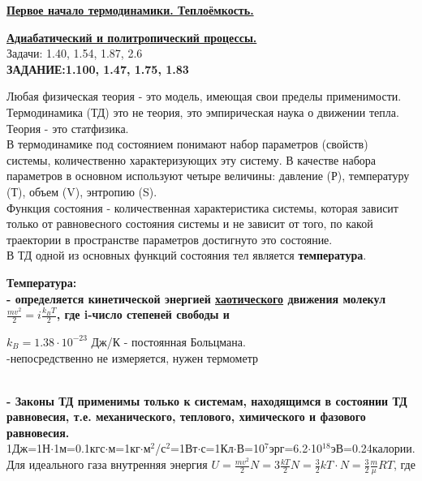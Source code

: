 \documentclass[12pt]{article}
\begin{document}
{\underline{\bf Первое начало термодинамики. Теплоёмкость.}

{\underline{\bf Адиабатический и политропический процессы.}\\

Задачи: 1.40, 1.54, 1.87, 2.6}\\

{\bf ЗАДАНИЕ:1.100, 1.47, 1.75, 1.83}

\vspace{0.5cm}

Любая физическая теория - это модель, имеющая свои пределы применимости. Термодинамика (ТД) это не
теория, это эмпирическая наука о движении тепла. Теория - это статфизика.\\

В термодинамике под состоянием понимают набор параметров (свойств) системы, количественно характеризующих эту систему. В качестве набора параметров в основном используют четыре величины: давление (Р), температуру (Т), объем (V), энтропию (S).\\

Функция состояния - количественная характеристика системы, которая зависит только от равновесного состояния системы и не зависит от того, по какой траектории в пространстве параметров достигнуто это состояние.\\

В ТД одной из основных функций состояния тел является {\bf температура}.\\

{\bf Температура: \\

- определяется кинетической энергией {\underline{хаотического}} движения молекул $\frac{mv^2}{2}=i\frac{k_B T}{2}$,
где i-число степеней свободы и

$k_B=1.38\cdot10^{-23}$ Дж/К - постоянная Больцмана.\\

-непосредственно не измеряется, нужен термометр}\\

{\bf - Законы ТД применимы только к системам, находящимся в состоянии ТД равновесия, т.е. механического, теплового, химического и фазового равновесия.}\\

1Дж=1Н$\cdot$1м=0.1кгс$\cdot$м=1кг$\cdot$м$^2$/с$^2$=1Вт$\cdot$с=1Кл$\cdot$В=10$^7$эрг=6.2$\cdot$10$^{18}$эВ=0.24калории.\\

Для идеального газа внутренняя энергия $U=\frac{mv^2}{2}N=3\frac{kT}{2}N=\frac{3}{2}kT\cdot N=\frac{3}{2}\frac{m}{\mu}RT$, где

}
\end{document}
